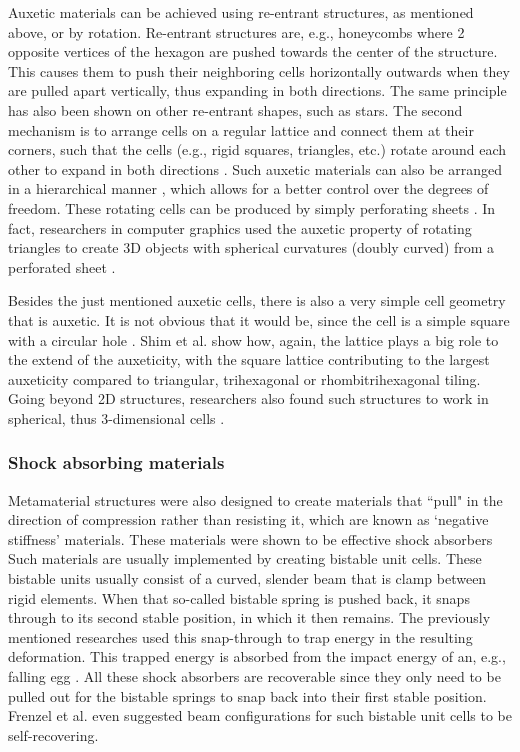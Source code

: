 {Auxetic materials can be achieved using re-entrant structures, as mentioned above, or by rotation. Re-entrant structures are, e.g., honeycombs where 2 opposite vertices of the hexagon are pushed towards the center of the structure. This causes them to push their neighboring cells horizontally outwards when they are pulled apart vertically, thus expanding in both directions. The same principle has also been shown on other re-entrant shapes, such as stars. The second mechanism is to arrange cells on a regular lattice and connect them at their corners, such that the cells (e.g., rigid squares, triangles, etc.) rotate around each other to expand in both directions \cite{Grima2000, Jiang2018}. Such auxetic materials can also be arranged in a hierarchical manner \cite{Seifi2017, Mousanezhad2015}, which allows for a better control over the degrees of freedom. These rotating cells can be produced by simply perforating sheets \cite{Shan2015a}. In fact, researchers in computer graphics used the auxetic property of rotating triangles to create 3D objects with spherical curvatures (doubly curved) from a perforated sheet \cite{Konakovic2016}.

Besides the just mentioned auxetic cells, there is also a very simple cell geometry that is auxetic. It is not obvious that it would be, since the cell is a simple square with a circular hole \cite{Mullin2007, Bertoldi2010}. Shim et al. \cite{Shim2013a} show how, again, the lattice plays a big role to the extend of the auxeticity, with the square lattice contributing to the largest auxeticity compared to triangular, trihexagonal or rhombitrihexagonal tiling. Going beyond 2D structures, researchers also found such structures to work in spherical, thus 3-dimensional cells \cite{Shim2012, Babaee2013}. 




\subsubsection{Shock absorbing materials}

Metamaterial structures were also designed to create materials that ``pull" in the direction of compression rather than resisting it, which are known as `negative stiffness' materials. These materials were shown to be effective shock absorbers \cite{Shan2015, Restrepo2015, Rafsanjani2015, Correa2015, Correa2015b, Harne2013} Such materials are usually implemented by creating bistable unit cells. These bistable units usually consist of a curved, slender beam that is clamp between rigid elements. When that so-called bistable spring is pushed back, it snaps through to its second stable position, in which it then remains. The previously mentioned researches used this snap-through to trap energy in the resulting deformation. This trapped energy is absorbed from the impact energy of an, e.g., falling egg \cite{Shan2015}. All these shock absorbers are recoverable since they only need to be pulled out for the bistable springs to snap back into their first stable position. Frenzel et al. \cite{Frenzel2016a} even suggested beam configurations for such bistable unit cells to be self-recovering.  

}
